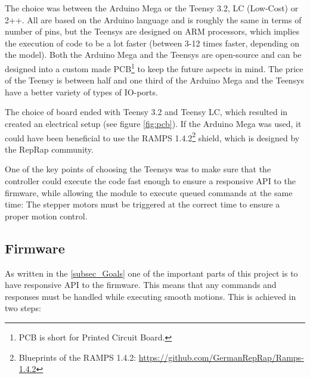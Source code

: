 \documentclass[10pt,a4paper]{article}
\begin{document}
		The choice was between the Arduino Mega or the Teensy 3.2, LC (Low-Cost) or 2++. All are based on the Arduino language and is roughly the same in terms of number of pins, but the Teensys are designed on ARM processors, which implies the execution of code to be a lot faster (between 3-12 times faster, depending on the model). Both the Arduino Mega and the Teensys are open-source and can be designed into a custom made PCB\footnote{PCB is short for Printed Circuit Board.} to keep the future aspects in mind. The price of the Teensy is between half and one third of the Arduino Mega and the Teensys have a better variety of types of IO-ports.
		
		The choice of board ended with Teensy 3.2 and Teensy LC, which resulted in created an electrical setup (see figure \ref{fig:pcb}). If the Arduino Mega was used, it could have been beneficial to use the RAMPS 1.4.2\footnote{Blueprints of the RAMPS 1.4.2: \url{https://github.com/GermanRepRap/Ramps-1.4.2}} shield, which is designed by the RepRap community.
		
		One of the key points of choosing the Teensys was to make sure that the controller could execute the code fast enough to ensure a responsive API to the firmware, while allowing the module to execute queued commands at the same time: The stepper motors must be triggered at the correct time to ensure a proper motion control. 
	
	
		\subsection{Firmware}
		As written in the \ref{subsec_Goals} one of the important parts of this project is to have responsive API to the firmware. This means that any commands and responses must be handled while executing smooth motions. This is achieved in two steps:
	
\end{document}
